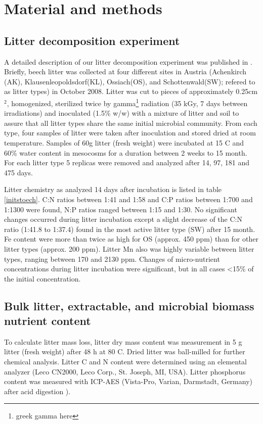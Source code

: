 \documentclass[authoryear,preprint,review,12pt]{elsarticle}
\begin{document}



\section{Material and methods}
\subsection{Litter decomposition experiment}
A detailed description of our litter decomposition experiment was published in \cite{Wanek2010}. Briefly, beech litter was collected at four different sites in Austria (Achenkirch (AK), Klausenleopoldsdorf(KL), Ossiach(OS), and Schottenwald(SW); refered to as litter types) in October 2008. Litter was cut to pieces of approximately 0.25cm$^2$, homogenized, sterilized twice by gamma\footnote{greek gamma here} radiation (35 kGy, 7 days between irradiations) and inoculated (1.5\% w/w) with a mixture of litter and soil to assure that all litter types share the same initial microbial community. From each type, four samples of litter were taken after inoculation and stored dried at room temperature. Samples of 60g litter (fresh weight) were incubated at 15 \textdegree C and 60\% water content in mesocosms for a duration between 2 weeks to 15 month. For each litter type 5 replicas were removed and analyzed after 14, 97, 181 and 475 days.

Litter chemistry as analyzed 14 days after incubation is listed in table \ref{initstoech}. C:N ratios between 1:41 and 1:58 and C:P ratios between 1:700 and 1:1300 were found, N:P ratios ranged between 1:15 and 1:30. No significant changes occurred during litter incubation except a slight decrease of the C:N ratio (1:41.8 to 1:37.4) found in the most active litter type (SW) after 15 month. Fe content were more than twice as high for OS (approx. 450 ppm) than for other litter types (approx. 200 ppm). Litter Mn also was highly variable between litter types, ranging between 170 and 2130 ppm. Changes of micro-nutrient concentrations during litter incubation were significant, but in all cases \textless 15\% of the initial concentration.

\subsection{Bulk litter, extractable, and microbial biomass nutrient content}
To calculate litter mass loss, litter dry mass content was measurement in 5 g litter (fresh weight) after 48 h at 80 \textdegree C. Dried litter was ball-milled for further chemical analysis. Litter C and N content were determined using an elemental analyzer (Leco CN2000, Leco Corp., St. Joseph, MI, USA). Litter phosphorus content was measured with ICP-AES (Vista-Pro, Varian, Darmstadt, Germany) after acid digestion \cite{Henschler1988}).
\end{document}

